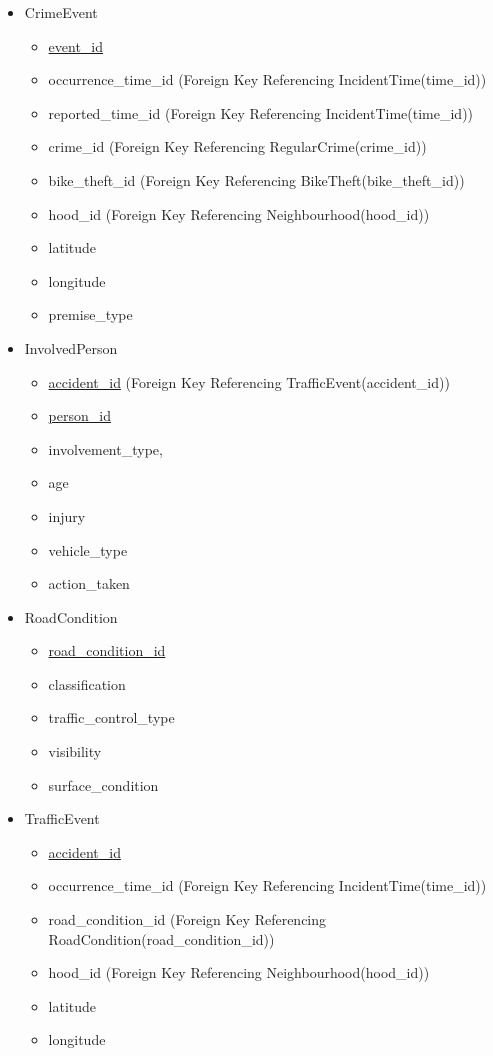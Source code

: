 \documentclass[12pt, a4paper]{article}
\begin{document}
\begin{itemize}
    \item CrimeEvent
        \begin{itemize}
        \item \underline{event\_id}
        \item occurrence\_time\_id (Foreign Key Referencing IncidentTime(time\_id))
        \item reported\_time\_id (Foreign Key Referencing IncidentTime(time\_id))
        \item crime\_id (Foreign Key Referencing RegularCrime(crime\_id))
        \item bike\_theft\_id (Foreign Key Referencing BikeTheft(bike\_theft\_id))
        \item hood\_id (Foreign Key Referencing Neighbourhood(hood\_id))
        \item latitude
        \item longitude
        \item premise\_type
    \end{itemize}
    \item InvolvedPerson
    \begin{itemize}
        \item \underline{accident\_id} (Foreign Key Referencing TrafficEvent(accident\_id))
        \item \underline{person\_id}
        \item involvement\_type,
        \item age
        \item injury
        \item vehicle\_type
        \item action\_taken
    \end{itemize}
    \item RoadCondition
    \begin{itemize}
        \item \underline{road\_condition\_id}
        \item classification
        \item traffic\_control\_type
        \item visibility
        \item surface\_condition
    \end{itemize}
    \item TrafficEvent
    \begin{itemize}
        \item \underline{accident\_id}
        \item occurrence\_time\_id (Foreign Key Referencing IncidentTime(time\_id))
        \item road\_condition\_id (Foreign Key Referencing RoadCondition(road\_condition\_id))
        \item hood\_id (Foreign Key Referencing Neighbourhood(hood\_id))
        \item latitude
        \item longitude
    \end{itemize}
\end{itemize}
\end{document}
